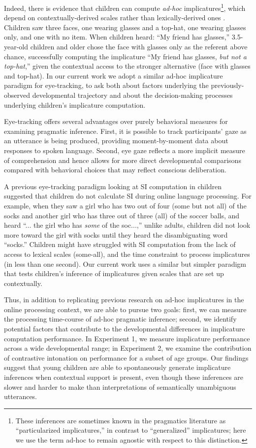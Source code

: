 \documentclass[10pt,letterpaper]{article}
\begin{document}
Indeed, there is evidence that children can compute \emph{ad-hoc} implicatures\footnote{These inferences are sometimes known in the pragmatics literature as ``particularized implicatures,'' in contrast to ``generalized'' implicatures; here we use the term ad-hoc to remain agnostic with respect to this distinction.}, which depend on contextually-derived scales rather than lexically-derived ones \cite{stillerLLD}. Children saw three faces, one wearing glasses and a top-hat, one wearing glasses only, and one with no item. When children heard: ``My friend has glasses,'' 3.5-year-old children and older chose the face with glasses only as the referent above chance, successfully computing the implicature ``My friend has glasses, \emph{but not a top-hat},'' given the contextual access to the stronger alternative (face with glasses and top-hat). In our current work we adopt a similar ad-hoc implicature paradigm for eye-tracking, to ask both about factors underlying the previously-observed developmental trajectory and about the decision-making processes underlying children's implicature computation. 

Eye-tracking offers several advantages over purely behavioral measures for examining pragmatic inference. First, it is possible to track participants' gaze as an utterance is being produced, providing moment-by-moment data about responses to spoken language. Second, eye gaze reflects a more implicit measure of comprehension and hence allows for more direct developmental comparisons compared with behavioral choices that may reflect conscious deliberation. 

A previous eye-tracking paradigm looking at SI computation in children \cite{huang2009semantic} suggested that children do not calculate SI during online language processing. For example, when they saw a girl who has two out of four (some but not all) of the socks and another girl who has three out of three (all) of the soccer balls, and heard ``... the girl who has \emph{some} of the soc...,'' unlike adults, children did not look more toward the girl with socks until they heard the disambiguating word ``socks.'' Children might have struggled with SI computation from the lack of access to lexical scales (some-all), and the time constraint to process implicatures (in less than one second). Our current work uses a similar but simpler paradigm that tests children's inference of implicatures given scales that are set up contextually.

Thus, in addition to replicating previous research on ad-hoc implicatures in the online processing context, we are able to pursue two goals: first, we can measure the processing time-course of ad-hoc pragmatic inference; second, we identify potential factors that contribute to the developmental differences in implicature computation performance. In Experiment 1, we measure implicature performance across a wide developmental range; in Experiment 2, we examine the contribution of contrastive intonation on performance for a subset of age groups. Our findings suggest that young children are able to spontaneously generate implicature inferences when contextual support is present, even though these inferences are slower and harder to make than interpretations of semantically unambiguous utterances.
\end{document}
